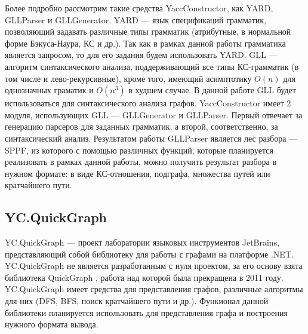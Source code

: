 \documentclass[14pt]{matmex-diploma-custom}
\begin{document}
	    Более подробно рассмотрим такие средства YaccConstructor, как YARD, GLLParser и GLLGenerator. YARD --- язык спецификаций грамматик, позволяющий задавать различные типы грамматик (атрибутные, в нормальной форме Бэкуса-Наура, КС и др.). Так как в рамках данной работы грамматика является запросом, то для его задания будем использовать YARD. GLL --- алгоритм синтаксического анализа, поддерживающий все типы КС-грамматик (в том числе и лево-рекурсивные), кроме того, имеющий асимптотику \(O(n)\) для однозначных граматик и \(O(n^3)\) в худшем случае. В данной работе GLL будет использоваться для синтаксического анализа графов. YaccConstructor имеет 2 модуля, использующих GLL --- GLLGenerator и GLLParser. Первый отвечает за генерацию парсеров для заданных грамматик, а второй, соответственно, за синтаксический анализ. Результатом работы GLLParser является лес разбора --- SPPF, из которого с помощью различных функций, которые планируется реализовать в рамках данной работы, можно получить результат разбора в нужном формате: в виде КС-отношения, подграфа, множества путей или кратчайшего пути.
	\subsection{YC.QuickGraph}
	    YC.QuickGraph --- проект лаборатории языковых инструментов JetBrains, представляющий собой библиотеку для работы с графами на платформе .NET. YC.QuickGraph не является разработанным с нуля проектом, за его основу взята библиотека QuickGraph \cite{quickgraph}, работа над которой была прекращена в 2011 году. YC.QuickGraph имеет средства для представления графов, различные алгоритмы для них (DFS, BFS, поиск кратчайшего пути и др.). Функионал данной библиотеки планируется использовать для представления графа и построения нужного формата вывода.
\end{document}
